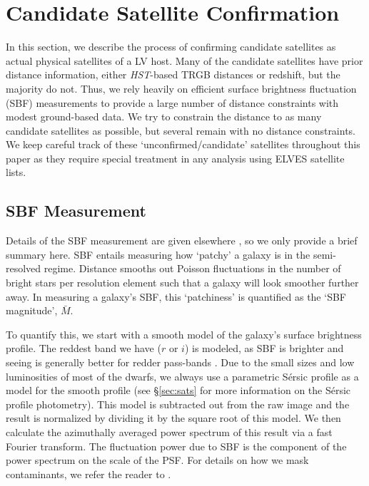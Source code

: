 \documentclass[twocolumn]{aastex62}
\begin{document}
\section{Candidate Satellite Confirmation}
\label{sec:distances}
In this section, we describe the process of confirming candidate satellites as actual physical satellites of a LV host. Many of the candidate satellites have prior distance information, either \emph{HST}-based TRGB distances or redshift, but the majority do not. Thus, we rely heavily on efficient surface brightness fluctuation (SBF) measurements to provide a large number of distance constraints with modest ground-based data. We try to constrain the distance to as many candidate satellites as possible, but several remain with no distance constraints. We keep careful track of these `unconfirmed/candidate' satellites throughout this paper as they require special treatment in any analysis using ELVES satellite lists.



\subsection{SBF Measurement}
Details of the SBF measurement are given elsewhere \citep{sbf_calib, carlsten2020b}, so we only provide a brief summary here. SBF entails measuring how `patchy' a galaxy is in the semi-resolved regime. Distance smooths out Poisson fluctuations in the number of bright stars per resolution element such that a galaxy will look smoother further away. In measuring a galaxy's SBF, this `patchiness' is quantified as the `SBF magnitude', $\bar{M}$. 

To quantify this, we start with a smooth model of the galaxy's surface brightness profile. The reddest band we have ($r$ or $i$) is modeled, as SBF is brighter and seeing is generally better for redder pass-bands \citep[e.g][]{jensen2003, scott_psf}. Due to the small sizes and low luminosities of most of the dwarfs, we always use a parametric S\'{e}rsic profile as a model for the smooth profile (see \S\ref{sec:sats} for more information on the S\'{e}rsic profile photometry). This model is subtracted out from the raw image and the result is normalized by dividing it by the square root of this model. We then calculate the azimuthally averaged power spectrum of this result via a fast Fourier transform. The fluctuation power due to SBF is the component of the power spectrum on the scale of the PSF. For details on how we mask contaminants, we refer the reader to \citep{sbf_calib, carlsten2020b}. 
\end{document}
